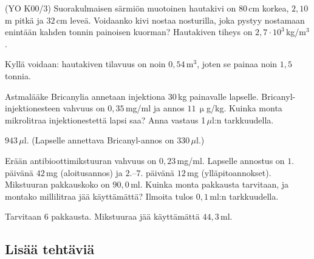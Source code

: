 \begin{tehtavasivu}
\begin{tehtava}
(YO K00/3) Suorakulmaisen särmiön muotoinen hautakivi on $80$\,cm korkea, $2,10$\,m pitkä ja $32$\,cm leveä.
Voidaanko kivi nostaa nosturilla, joka pystyy nostamaan enintään kahden tonnin painoisen kuorman? Hautakiven tiheys on $2,7 \cdot 10^3$\,kg/m$^3$.
\begin{vastaus}
Kyllä voidaan: hautakiven tilavuus on noin $0,54$\,m$^3$, joten se painaa noin $1,5$ tonnia.
\end{vastaus}
\end{tehtava}

\begin{tehtava}
Astmalääke Bricanylia annetaan injektiona $30$\,kg painavalle lapselle. Bricanyl-injektionesteen vahvuus on $0,35$\,mg/ml ja annos $11$\,$\upmu$g/kg. Kuinka monta mikrolitraa injektionestettä lapsi saa? Anna vastaus 1\,$\mu$l:n tarkkuudella. %
 \begin{vastaus}
$943$\,$\mu$l. (Lapselle annettava Bricanyl-annos on $330$\,$\mu$l.) %
 \end{vastaus}
\end{tehtava}

\begin{tehtava}
Erään antibioottimikstuuran vahvuus on $0,23$\,mg/ml. Lapselle annostus on $1.$ päivänä $42$\,mg (aloitusannos) 
ja $2$.--$7$. päivänä $12$\,mg (ylläpitoannokset). Mikstuuran pakkauskoko on $90,0$\,ml. Kuinka monta pakkausta tarvitaan, ja montako millilitraa jää käyttämättä? Ilmoita tulos $0,1$\,ml:n tarkkuudella.
 \begin{vastaus}
Tarvitaan $6$ pakkausta. Mikstuuraa jää käyttämättä $44,3$\,ml.
 \end{vastaus}
\end{tehtava}


\subsection*{Lisää tehtäviä}




\end{tehtavasivu}
